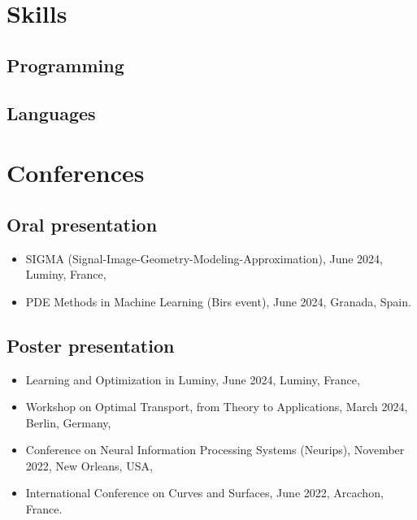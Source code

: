 \documentclass[11pt,a4paper,sans]{moderncv}
\begin{document}
\clearpage

\section{Skills}

\setlength{\columnsep}{80pt}
\begin{multicols}{2}
	
	\subsection{Programming}
	
	\vfill\null
	\columnbreak
	
	\subsection{Languages}
	
\end{multicols}

\section{Conferences}

\subsection{Oral presentation}

\begin{itemize}
	\item SIGMA (Signal-Image-Geometry-Modeling-Approximation), June 2024, Luminy, France,
	\item PDE Methods in Machine Learning (Birs event), June 2024, Granada, Spain.
\end{itemize}

\subsection{Poster presentation}

\begin{itemize}
	\item Learning and Optimization in Luminy, June 2024, Luminy, France,
	\item Workshop on  Optimal Transport, from Theory to Applications, March 2024, Berlin, Germany,
	\item Conference on Neural Information Processing Systems (Neurips), November 2022, New Orleans, USA,
	\item International Conference on Curves and Surfaces, June 2022, Arcachon, France.
\end{itemize}
\end{document}
